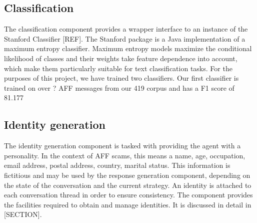 \subsection*{Classification}
The classification component provides a wrapper interface to an instance of the Stanford Classifier [REF]. The Stanford package is a Java implementation of a maximum entropy classifier. Maximum entropy models maximize the conditional likelihood of classes and their weights take feature dependence into account, which make them particularly suitable for text classification tasks. For the purposes of this project, we have trained two classifiers. Our first classifier is trained on over ? AFF messages from our 419 corpus and has a F1 score of  81.177%

\subsection*{Identity generation}
The identity generation component is tasked with providing the agent with a personality. In the context of AFF scams, this means a name, age, occupation, email address, postal address, country, marital status. This information is fictitious and may be used by the response generation component, depending on the state of the conversation and the current strategy. An identity is attached to each conversation thread in order to ensure consistency. The component provides the facilities required to obtain and manage identities. It is discussed in detail in [SECTION].

